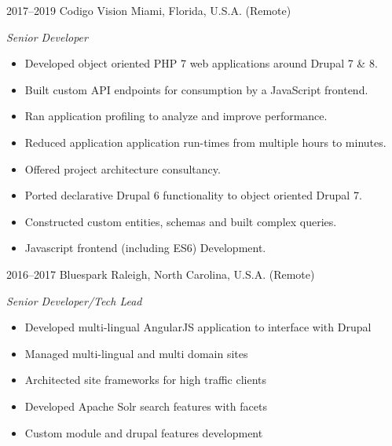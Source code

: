 \documentclass[]{friggeri-cv} %
\begin{document}
\begin{entrylist}
\entry
{2017--2019}
{Codigo Vision}
{Miami, Florida, U.S.A. (Remote)}
{\emph{Senior Developer}
\begin{itemize}
\item Developed object oriented PHP 7 web applications around Drupal 7 \& 8.
\item Built custom API endpoints for consumption by a JavaScript frontend.
\item Ran application profiling to analyze and improve performance.
\item Reduced application application run-times from multiple hours to minutes.
\item Offered project architecture consultancy.
\item Ported declarative Drupal 6 functionality to object oriented Drupal 7.
\item Constructed custom entities, schemas and built complex queries.
\item Javascript frontend (including ES6) Development.
\end{itemize}}

\entry
{2016--2017}
{Bluespark}
{Raleigh, North Carolina, U.S.A. (Remote)}
{\emph{Senior Developer/Tech Lead}
\begin{itemize}
\item Developed multi-lingual AngularJS application to interface with Drupal
\item Managed multi-lingual and multi domain sites
\item Architected site frameworks for high traffic clients
\item Developed Apache Solr search features with facets
\item Custom module and drupal features development
\end{itemize}}


\end{entrylist}
\end{document}
